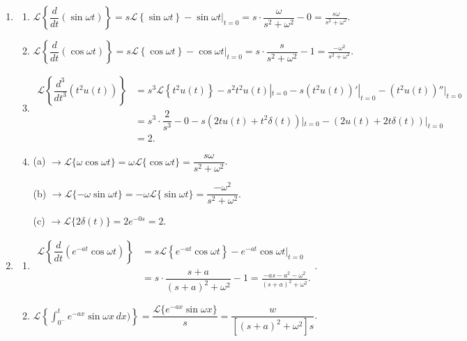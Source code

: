 \documentclass[11pt]{article}
\begin{document}
\begin{enumerate}[leftmargin=*,label=\textbf{2.\arabic*.}]
\item \begin{enumerate}[label=\textbf{\alph*)}]
\item $\mathscr{L}\left\{\dfrac{d}{dt}(\sin\omega t)\right\}=s\mathscr{L}\left\{\sin\omega t\right\}-\sin\omega t|_{t=0}=s\cdot\dfrac{\omega}{s^2+\omega^2}-0=\boxed{\frac{s\omega}{s^2+\omega^2}}$.
\item $\mathscr{L}\left\{\dfrac{d}{dt}(\cos\omega t)\right\}=s\mathscr{L}\left\{\cos\omega t\right\}-\cos\omega t|_{t=0}=s\cdot\dfrac{s}{s^2+\omega^2}-1=\boxed{\frac{-\omega^2}{s^2+\omega^2}}.$
\item $\begin{array}{rl}\mathscr{L}\left\{\dfrac{d^3}{dt^3}(t^2u(t))\right\}&=s^3\mathscr{L}\left\{t^2u(t)\right\}-s^2t^2u(t)|_{t=0}-s(t^2u(t))'|_{t=0}-(t^2u(t))''|_{t=0}\\&=s^3\cdot\dfrac{2}{s^3}-0-s(2tu(t)+t^2\delta(t))|_{t=0}-(2u(t)+2t\delta(t))|_{t=0}\\&=\boxed{2}.\end{array}$

\item (a) $\rightarrow\mathscr{L}\{\omega\cos\omega t\}=\omega\mathscr{L}\{\cos\omega t\}=\boxed{\dfrac{s\omega}{s^2+\omega^2}}$.

(b) $\rightarrow\mathscr{L}\{-\omega\sin\omega t\}=-\omega\mathscr{L}\{\sin\omega t\}=\boxed{\dfrac{-\omega^2}{s^2+\omega^2}}$.

(c) $\rightarrow\mathscr{L}\{2\delta(t)\}=2e^{-0s}=\boxed2$.
\end{enumerate}

\item \begin{enumerate}[label=\textbf{\alph*)}]

\item $\begin{array}{rl}\mathscr{L}\left\{\dfrac{d}{dt}(e^{-at}\cos\omega t)\right\}&=s\mathscr{L}\left\{e^{-at}\cos\omega t\right\}-e^{-at}\cos\omega t|_{t=0}\\&=s\cdot\dfrac{s+a}{(s+a)^2+\omega^2}-1=\boxed{\frac{-as-a^2-\omega^2}{(s+a)^2+\omega^2}}.\end{array}$.

\item $\displaystyle\mathscr{L}\left\{\int_{0^-}^te^{-ax}\sin\omega x\,dx)\right\}=\dfrac{\mathscr{L}\{e^{-ax}\sin\omega x\}}{s}=\boxed{\dfrac{w}{[(s+a)^2+\omega^2]s}}$.

\end{enumerate}


\end{enumerate}
\end{document}
